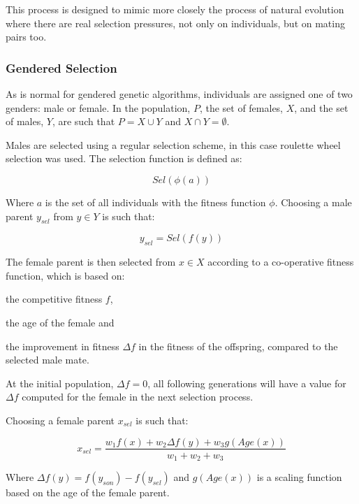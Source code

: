 \documentclass[10pt, a4paper]{article}
\begin{document}
This process is designed to mimic more closely the process of natural evolution
where there are real selection pressures, not only on individuals, but on
mating pairs too.

\subsubsection{Gendered Selection}
As is normal for gendered genetic algorithms, individuals are assigned one of
two genders: male or female. In the population, $P$, the set of females, $X$,
and the set of males, $Y$, are such that $P = X \cup Y$ and $X \cap Y = \emptyset$.

Males are selected using a regular selection scheme, in this case roulette 
wheel selection was used. The selection function is defined as:

\begin{equation}
Sel(\phi(a))
\end{equation}

Where $a$ is the set of all individuals with the fitness function $\phi$.
Choosing a male parent $y_{sel}$ from $y \in Y$ is such that:

\begin{equation}
y_{sel} = Sel(f(y))
\end{equation}

The female parent is then selected from $x \in X$ according to a co-operative
fitness function, which is based on:
\begin{inparaenum}[a\upshape)]
\item the competitive fitness $f$,
\item the age of the female and
\item the improvement in fitness $\Delta f$ in the fitness of the offspring,
      compared to the selected male mate.
\end{inparaenum}

At the initial population, $\Delta f = 0$, all following generations will have a
value for $\Delta f$ computed for the female in the next selection process.

Choosing a female parent $x_{sel}$ is such that:

\begin{equation}
x_{sel} = \frac{w_1 f(x) + w_2 \Delta f(y) + w_3 g(Age(x))}{w_1 + w_2 + w_3}
\end{equation}

Where $\Delta f(y) = f(y_{son}) - f(y_{sel})$ and $g(Age(x))$ is a scaling
function based on the age of the female parent.
\end{document}
